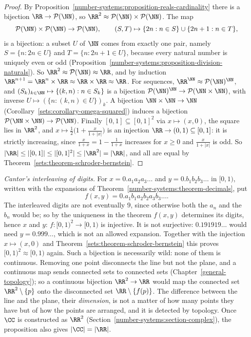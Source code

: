 \begin{proof}
By Proposition~\ref{number-systems:proposition-reals-cardinality} there is a bijection $\RR \to \mathcal{P}(\NN)$, so $\RR^2 \approx \mathcal{P}(\NN) \times \mathcal{P}(\NN)$. The map
\[
\mathcal{P}(\NN) \times \mathcal{P}(\NN) \to \mathcal{P}(\NN), \qquad (S, T) \mapsto \{2n : n \in S\} \cup \{2n + 1 : n \in T\},
\]
is a bijection: a subset $U$ of $\NN$ comes from exactly one pair, namely $S = \{n : 2n \in U\}$ and $T = \{n : 2n + 1 \in U\}$, because every natural number is uniquely even or odd
(Proposition~\ref{number-systems:proposition-division-naturals}). So $\RR^2 \approx \mathcal{P}(\NN) \approx \RR$, and by induction $\RR^{n+1} = \RR^n \times \RR \approx \RR \times \RR \approx \RR$. For sequences,
$\RR^{\NN} \approx \mathcal{P}(\NN)^{\NN}$, and $(S_k)_{k \in \NN} \mapsto \{(k, n) : n \in S_k\}$ is a bijection $\mathcal{P}(\NN)^{\NN} \to \mathcal{P}(\NN \times \NN)$, with inverse $U \mapsto (\{n : (k, n) \in U\})_k$. A
bijection $\NN \times \NN \to \NN$ (Corollary~\ref{sets:corollary-omega-squared}) induces a bijection $\mathcal{P}(\NN \times \NN) \to \mathcal{P}(\NN)$. Finally $[0, 1] \subseteq [0, 1]^2$ via $x \mapsto (x, 0)$, the square lies in $\RR^2$, and
$x \mapsto \frac12\bigl(1 + \frac{x}{1 + |x|}\bigr)$ is an injection $\RR \to (0, 1) \subseteq [0, 1]$: it is strictly increasing, since $\frac{x}{1 + x} = 1 - \frac1{1 + x}$ increases for $x \geq 0$ and
$\frac{x}{1 + |x|}$ is odd. So $|\RR| \leq |[0, 1]| \leq |[0, 1]^2| \leq |\RR^2| = |\RR|$, and all are equal by Theorem~\ref{sets:theorem-schroder-bernstein}.
\end{proof}

\begin{remark}\label{number-systems:remark-interleaving}
\emph{Cantor's interleaving of digits.} For $x = 0.a_1a_2a_3\ldots$ and $y = 0.b_1b_2b_3\ldots$ in $[0, 1)$, written with the expansions of Theorem~\ref{number-systems:theorem-decimals}, put
\[
f(x, y) = 0.a_1b_1a_2b_2a_3b_3\ldots .
\]
The interleaved digits are not eventually $9$, since otherwise both the $a_n$ and the $b_n$ would be; so by the uniqueness in the theorem $f(x, y)$ determines its digits, hence $x$ and $y$: $f \colon [0, 1)^2 \to [0, 1)$ is
injective. It is not surjective: $0.191919\ldots$ would need $y = 0.999\ldots$, which is not an allowed expansion. Together with the injection $x \mapsto (x, 0)$ and
Theorem~\ref{sets:theorem-schroder-bernstein} this proves $[0, 1)^2 \approx [0, 1)$ again. Such a bijection is necessarily wild: none of them is continuous. Removing one point disconnects the line but not the plane, and a continuous map sends connected
sets to connected sets (Chapter~\ref{general-topology}); so a continuous bijection $\RR^2 \to \RR$ would map the connected set $\RR^2 \setminus \{p\}$ onto the disconnected set $\RR \setminus \{f(p)\}$. The difference between
the line and the plane, their \emph{dimension}, is not a matter of how many points they have but of how the points are arranged, and it is detected by topology. Once $\CC$ is constructed as $\RR^2$
(Section~\ref{number-systems:section-complex}), the proposition also gives $|\CC| = |\RR|$.
\end{remark}

